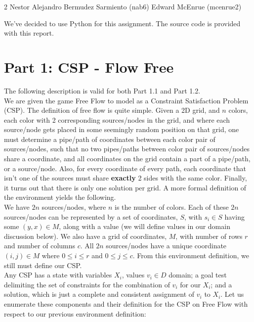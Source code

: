 \documentclass[11pt]{article}
\begin{document}
\homework
    {2}
    {Nestor Alejandro Bermudez Sarmiento (nab6)}
    {Edward McEnrue (mcenrue2)}

We've decided to use Python for this assignment. The source code is provided with this report.\\

\section*{Part 1: CSP - Flow Free}

The following description is valid for both Part 1.1 and Part 1.2.\\

We are given the game Free Flow to model as a Constraint Satisfaction Problem (CSP). The definition of free flow is quite simple. Given a 2D grid, and $n$ colors, each color with 2 corresponding sources/nodes in the grid, and where each source/node gets placed in some seemingly random position on that grid, one must determine a pipe/path of coordinates between each color pair of sources/nodes, such that no two pipes/paths between color pair of sources/nodes share a coordinate, and all coordinates on the grid contain a part of a pipe/path, or a source/node. Also, for every coordinate of every path, each coordinate that isn't one of the sources must share \textbf{exactly} 2 sides with the same color. Finally, it turns out that there is only one solution per grid. A more formal definition of the environment yields the following.\\

We have $2n$ sources/nodes, where $n$ is the number of colors. Each of these $2n$ sources/nodes can be represented by a set of coordinates, $S$, with $s_i \in S$ having some $(y,x) \in M$, along with a value (we will define values in our domain discussion below). We also have a grid of coordinates, $M$, with number of rows $r$ and number of columns $c$. All $2n$ sources/nodes have a unique coordinate $(i,j) \in M$ where $0 \leq i \leq r$ and $0 \leq j \leq c$. From this environment definition, we still must define our CSP.\\




Any CSP has a state with variables $X_i$, values $v_i \in D$ domain; a goal test delimiting the set of constraints for the combination of $v_i$ for our $X_i$; and a solution, which is just a complete and consistent assignment of $v_i$ to $X_i$. Let us enumerate these components and their definition for the CSP on Free Flow with respect to our previous environment definition:
\end{document}
